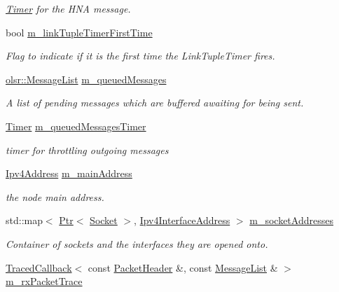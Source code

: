 \begin{DoxyCompactItemize}
\begin{DoxyCompactList}\small\item\em \hyperlink{classns3_1_1Timer}{Timer} for the H\+NA message. \end{DoxyCompactList}\item 
bool \hyperlink{classns3_1_1olsr_1_1RoutingProtocol_ae6557d76350cf59d34d2aae8e9c79831}{m\+\_\+link\+Tuple\+Timer\+First\+Time}
\begin{DoxyCompactList}\small\item\em Flag to indicate if it is the first time the Link\+Tuple\+Timer fires. \end{DoxyCompactList}\item 
\hyperlink{namespacens3_1_1olsr_af17c710718a5637d01f37804a0a53e78}{olsr\+::\+Message\+List} \hyperlink{classns3_1_1olsr_1_1RoutingProtocol_a1366596191a80005da6f45af00585d1d}{m\+\_\+queued\+Messages}
\begin{DoxyCompactList}\small\item\em A list of pending messages which are buffered awaiting for being sent. \end{DoxyCompactList}\item 
\hyperlink{classns3_1_1Timer}{Timer} \hyperlink{classns3_1_1olsr_1_1RoutingProtocol_a8b54985da7787840baa68ce4781e5d76}{m\+\_\+queued\+Messages\+Timer}
\begin{DoxyCompactList}\small\item\em timer for throttling outgoing messages \end{DoxyCompactList}\item 
\hyperlink{classns3_1_1Ipv4Address}{Ipv4\+Address} \hyperlink{classns3_1_1olsr_1_1RoutingProtocol_a58cc50ed5d1039aab603e90e318aabfb}{m\+\_\+main\+Address}
\begin{DoxyCompactList}\small\item\em the node main address. \end{DoxyCompactList}\item 
std\+::map$<$ \hyperlink{classns3_1_1Ptr}{Ptr}$<$ \hyperlink{classns3_1_1Socket}{Socket} $>$, \hyperlink{classns3_1_1Ipv4InterfaceAddress}{Ipv4\+Interface\+Address} $>$ \hyperlink{classns3_1_1olsr_1_1RoutingProtocol_ae590f1f394f2ebc0fac434a6866d7c75}{m\+\_\+socket\+Addresses}
\begin{DoxyCompactList}\small\item\em Container of sockets and the interfaces they are opened onto. \end{DoxyCompactList}\item 
\hyperlink{classns3_1_1TracedCallback}{Traced\+Callback}$<$ const \hyperlink{classns3_1_1olsr_1_1PacketHeader}{Packet\+Header} \&, const \hyperlink{namespacens3_1_1olsr_af17c710718a5637d01f37804a0a53e78}{Message\+List} \& $>$ \hyperlink{classns3_1_1olsr_1_1RoutingProtocol_a861b1d2ce370ab0137e67c5a1102a937}{m\+\_\+rx\+Packet\+Trace}

\end{DoxyCompactItemize}
